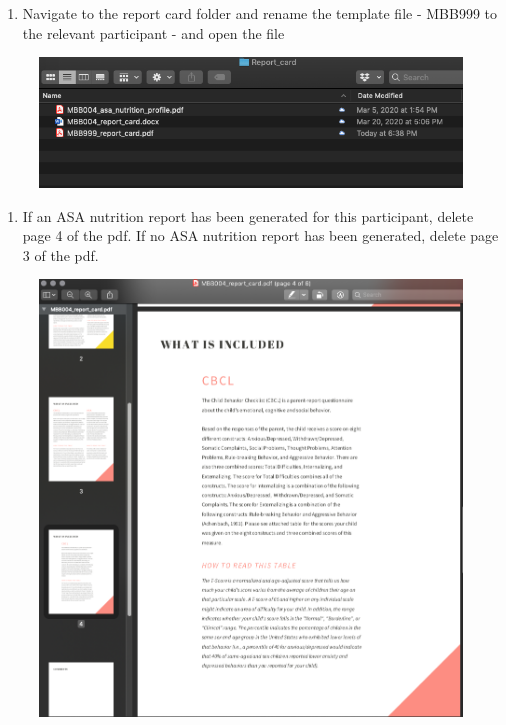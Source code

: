 \documentclass[]{book}
\providecommand{\tightlist}{%
  \setlength{\itemsep}{0pt}\setlength{\parskip}{0pt}}
\begin{document}
\begin{enumerate}
\def\labelenumi{\arabic{enumi}.}
\setcounter{enumi}{1}
\tightlist
\item
  Navigate to the report card folder and rename the template file - MBB999 to the relevant participant - and open the file
\end{enumerate}

\begin{figure}
\centering
\includegraphics{images/final_checklist/report_cards/2.png}
\caption{}
\end{figure}

\begin{enumerate}
\def\labelenumi{\arabic{enumi}.}
\setcounter{enumi}{2}
\tightlist
\item
  If an ASA nutrition report has been generated for this participant, delete page 4 of the pdf. If no ASA nutrition report has been generated, delete page 3 of the pdf.
\end{enumerate}

\begin{figure}
\centering
\includegraphics{images/final_checklist/report_cards/3.png}
\caption{}
\end{figure}
\end{document}
